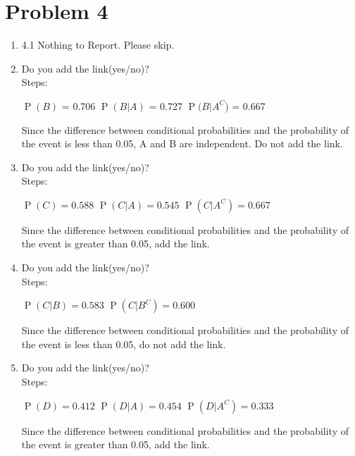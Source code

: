 \documentclass[english]{article}
\begin{document}
\section*{Problem 4}
\begin{enumerate}
    \item 4.1 Nothing to Report. Please skip.
    \item Do you add the link(yes/no)?
    \\ Steps: 
    
    $\operatorname{P}(B)$ = 0.706 \newline
    $\operatorname{P}(B|A)$ = 0.727 \newline
    $\operatorname{P}(B|A^C$) = 0.667
    
    Since the difference between conditional probabilities and the probability of the event is less than 0.05, A and B are independent. Do not add the link.
    
    \item Do you add the link(yes/no)?
	\\ Steps: 
    
    $\operatorname{P}(C) = 0.588$ \newline
    $\operatorname{P}(C|A) = 0.545$ \newline
    $\operatorname{P}(C|A^C) = 0.667$
    
    Since the difference between conditional probabilities and the probability of the event is greater than 0.05, add the link.
    
    \item Do you add the link(yes/no)?
	\\ Steps: 
    
    $\operatorname{P}(C | B) = 0.583$ \newline
    $\operatorname{P}(C | B^C) = 0.600$ 
        
    Since the difference between conditional probabilities and the probability of the event is less than 0.05, do not add the link.
    
    \item Do you add the link(yes/no)?
	\\ Steps: 
    
    $\operatorname{P}(D) = 0.412$ \newline
    $\operatorname{P}(D | A) = 0.454$ \newline
    $\operatorname{P}(D | A^C) = 0.333$ 
        
    Since the difference between conditional probabilities and the probability of the event is greater than 0.05, add the link.
    

\end{enumerate}
\end{document}
